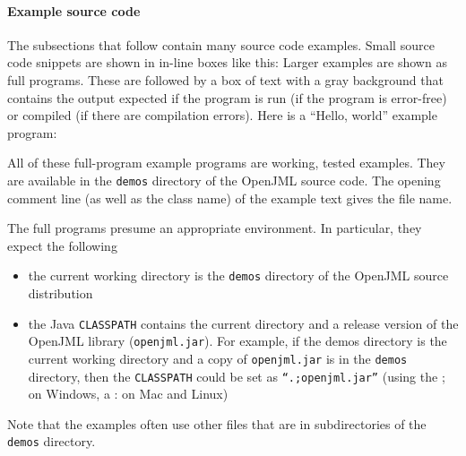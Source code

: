 \paragraph{Example source code}
The subsections that follow contain many source code examples. 
Small source code snippets are shown in in-line boxes like this:
Larger examples are shown as full programs. These are followed by a box of text with a gray background that contains the output expected if the program is run (if the program is error-free) or compiled (if there are compilation errors).
Here is a ``Hello, world'' example program:

\noindent
All of these full-program example programs are working, tested examples.
They are available in the {\tt demos} directory of the OpenJML source code. The opening comment
line (as well as the class name) of the example text gives the file name.

The full programs presume an appropriate environment. In particular, they expect the following
\begin{itemize}
\item the current working directory is the {\tt demos} directory of the OpenJML source distribution
\item the Java {\tt CLASSPATH} contains the current directory and a release version of the
OpenJML library ({\tt openjml.jar}). For example, if the demos directory is the current working directory and a copy of {\tt openjml.jar} is in the 
{\tt demos} directory, then the {\tt CLASSPATH} could be set as {\tt ``.;openjml.jar''} (using the ; on Windows, a : on Mac and Linux)
\end{itemize}
Note that the examples often use other files that are in subdirectories of the {\tt demos} directory.

